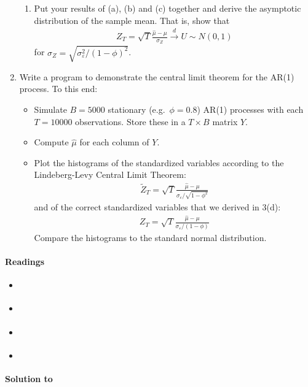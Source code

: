 \begin{enumerate}
\begin{enumerate}
  \item
  Put your results of (a), (b) and (c) together and derive the asymptotic distribution of the sample mean.
  That is, show that
  \begin{align*}
  Z_{T} =\sqrt{T}\frac{\hat{\mu} -\mu }{\sigma_Z} \overset{d}{\rightarrow} U \sim N(0,1)
  \end{align*}
  for \(\sigma_Z=\sqrt{\sigma_\varepsilon^2/{(1-\phi)}^2}\).
\end{enumerate}

\item
 Write a program to demonstrate the central limit theorem for the AR{(1)} process. To this end:

\begin{itemize}

  \item
  Simulate \(B=5000\) stationary (e.g.\
  \(\phi=0.8\)) AR{(1)} processes with each \(T=10000\) observations.
  Store these in a \(T \times B\) matrix \(Y\).

  \item
  Compute \(\hat{\mu}\) for each column of \(Y\).

  \item
  Plot the histograms of the standardized variables according to the Lindeberg-Levy Central Limit Theorem:
  \begin{align*}
  \widetilde{Z}_T = \sqrt{T}\frac{\hat{\mu}-\mu}{\sigma_{\varepsilon }/\sqrt{1-\phi^2}}
  \end{align*}
  and of the correct standardized variables that we derived in 3(d):
  \begin{align*}
  Z_T = \sqrt{T}\frac{\hat{\mu}-\mu}{\sigma_{\varepsilon }/(1-\phi)}
  \end{align*}
  Compare the histograms to the standard normal distribution.

\end{itemize}

\end{enumerate}

\paragraph{Readings}
\begin{itemize}
\item \textcite{Crack.Ledoit_2010_CentralLimitTheorems}
\item \textcite[App. C]{Lutkepohl_2005_NewIntroductionMultiple}
\item \textcite[App. C]{Neusser_2016_TimeSeriesEconometrics}
\item \textcite[Ch. 5]{White_2001_AsymptoticTheoryEconometricians}
\end{itemize}

\begin{solution}\textbf{Solution to }
\ifDisplaySolutions%

\fi
\newpage
\end{solution}